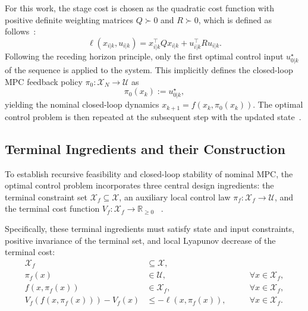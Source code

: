 For this work, the stage cost is chosen as the quadratic cost function with positive definite weighting matrices $Q \succ 0$ and $R \succ 0$, 
which is defined as follows~:
\begin{equation}
    \label{eq:stage-cost}
    \ell(x_{i|k}, u_{i|k}) = x_{i|k}^\top Q x_{i|k} + u_{i|k}^\top R u_{i|k}.
\end{equation}
Following the receding horizon principle, only the first optimal control input $u_{0|k}^\star$ of the sequence is applied to the system.
This implicitly defines the closed-loop MPC feedback policy $\pi_0: \mathcal{X}_N \to \mathcal{U}$ as
\begin{equation}
    \label{eq:mpc-feedback-policy}
    \pi_0(x_k) := u_{0|k}^\star,
\end{equation}
yielding the nominal closed-loop dynamics $x_{k+1} = f(x_k, \pi_0(x_k))$. 
The optimal control problem  is then repeated at the subsequent step with 
the updated state~.


\subsection{Terminal Ingredients and their Construction}
\label{subsec:terminal-set-cost} 

To establish recursive feasibility and closed-loop stability of nominal MPC, the optimal control problem  
incorporates three central design ingredients: 
the terminal constraint set $\mathcal{X}_f \subseteq \mathcal{X}$, an auxiliary local control law $\pi_f: \mathcal{X}_f \to \mathcal{U}$, 
and the terminal cost function $V_f: \mathcal{X}_f \to \mathbb{R}_{\ge 0}$~
.

Specifically, these terminal ingredients must satisfy state and input constraints, positive invariance of the terminal set, 
and local Lyapunov decrease of the terminal cost:
\begin{subequations}
    \label{eq:terminal-conditions}
    \begin{align}
        \mathcal{X}_f &\subseteq \mathcal{X}, \label{eq:term-state-constraint} \\
        \pi_f(x) &\in \mathcal{U}, \qquad &\forall x \in \mathcal{X}_f, \label{eq:term-input-constraint} \\
        f(x, \pi_f(x)) &\in \mathcal{X}_f, \qquad &\forall x \in \mathcal{X}_f, \label{eq:term-positive-invariance} \\
        V_f(f(x, \pi_f(x))) - V_f(x) &\leq -\ell(x, \pi_f(x)), \qquad &\forall x \in \mathcal{X}_f. \label{eq:term-cost-decrease}
    \end{align}
\end{subequations}


